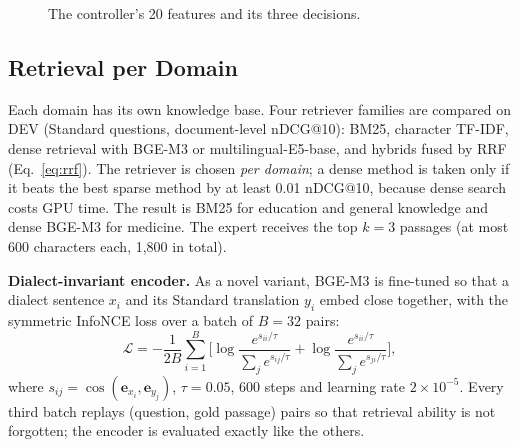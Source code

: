 \begin{figure}[!t]
\centering
{}
\caption{The controller's 20 features and its three decisions.}
\label{fig:controller}
\end{figure}

\subsection{Retrieval per Domain}
Each domain has its own knowledge base. Four retriever families are compared on DEV (Standard questions, document-level nDCG@10): BM25, character TF-IDF, dense retrieval with BGE-M3 or multilingual-E5-base, and hybrids fused by RRF (Eq.~\ref{eq:rrf}). The retriever is chosen \emph{per domain}; a dense method is taken only if it beats the best sparse method by at least 0.01 nDCG@10, because dense search costs GPU time. The result is BM25 for education and general knowledge and dense BGE-M3 for medicine. The expert receives the top $k=3$ passages (at most 600 characters each, 1,800 in total).

\textbf{Dialect-invariant encoder.} As a novel variant, BGE-M3 is fine-tuned so that a dialect sentence $x_i$ and its Standard translation $y_i$ embed close together, with the symmetric InfoNCE loss \cite{oord2018cpc} over a batch of $B=32$ pairs:
\begin{equation}
\mathcal{L}=-\frac{1}{2B}\sum_{i=1}^{B}\Big[\log\frac{e^{s_{ii}/\tau}}{\sum_j e^{s_{ij}/\tau}}+\log\frac{e^{s_{ii}/\tau}}{\sum_j e^{s_{ji}/\tau}}\Big],
\end{equation}
where $s_{ij}=\cos(\mathbf{e}_{x_i},\mathbf{e}_{y_j})$,
$\tau=0.05$, 600 steps and learning rate $2\times10^{-5}$. Every third batch replays (question, gold passage) pairs so that retrieval ability is not forgotten; the encoder is evaluated exactly like the others.

